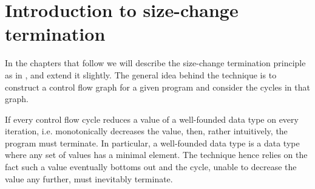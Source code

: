 \section{Introduction to size-change termination}

In the chapters that follow we will describe the size-change termination
principle as in \cite{size-change}, and extend it slightly. The general idea
behind the technique is to construct a control flow graph for a given program
and consider the cycles in that graph.

If every control flow cycle reduces a value of a well-founded data type on
every iteration, i.e. monotonically decreases the value, then, rather
intuitively, the program must terminate. In particular, a well-founded data
type is a data type where any set of values has a minimal element. The
technique hence relies on the fact such a value eventually bottoms out and the
cycle, unable to decrease the value any further, must inevitably terminate.

